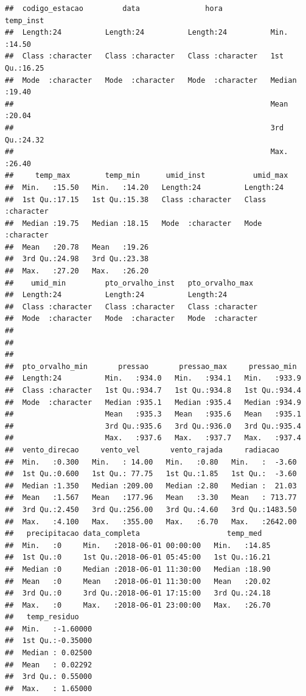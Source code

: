 \documentclass[]{book}
\theoremstyle{definition}
\theoremstyle{definition}
\theoremstyle{definition}
\theoremstyle{remark}
\begin{document}
\begin{verbatim}
##  codigo_estacao         data               hora             temp_inst    
##  Length:24          Length:24          Length:24          Min.   :14.50  
##  Class :character   Class :character   Class :character   1st Qu.:16.25  
##  Mode  :character   Mode  :character   Mode  :character   Median :19.40  
##                                                           Mean   :20.04  
##                                                           3rd Qu.:24.32  
##                                                           Max.   :26.40  
##     temp_max        temp_min      umid_inst           umid_max        
##  Min.   :15.50   Min.   :14.20   Length:24          Length:24         
##  1st Qu.:17.15   1st Qu.:15.38   Class :character   Class :character  
##  Median :19.75   Median :18.15   Mode  :character   Mode  :character  
##  Mean   :20.78   Mean   :19.26                                        
##  3rd Qu.:24.98   3rd Qu.:23.38                                        
##  Max.   :27.20   Max.   :26.20                                        
##    umid_min         pto_orvalho_inst   pto_orvalho_max   
##  Length:24          Length:24          Length:24         
##  Class :character   Class :character   Class :character  
##  Mode  :character   Mode  :character   Mode  :character  
##                                                          
##                                                          
##                                                          
##  pto_orvalho_min       pressao       pressao_max     pressao_min   
##  Length:24          Min.   :934.0   Min.   :934.1   Min.   :933.9  
##  Class :character   1st Qu.:934.7   1st Qu.:934.8   1st Qu.:934.4  
##  Mode  :character   Median :935.1   Median :935.4   Median :934.9  
##                     Mean   :935.3   Mean   :935.6   Mean   :935.1  
##                     3rd Qu.:935.6   3rd Qu.:936.0   3rd Qu.:935.4  
##                     Max.   :937.6   Max.   :937.7   Max.   :937.4  
##  vento_direcao     vento_vel       vento_rajada     radiacao      
##  Min.   :0.300   Min.   : 14.00   Min.   :0.80   Min.   :  -3.60  
##  1st Qu.:0.600   1st Qu.: 77.75   1st Qu.:1.85   1st Qu.:  -3.60  
##  Median :1.350   Median :209.00   Median :2.80   Median :  21.03  
##  Mean   :1.567   Mean   :177.96   Mean   :3.30   Mean   : 713.77  
##  3rd Qu.:2.450   3rd Qu.:256.00   3rd Qu.:4.60   3rd Qu.:1483.50  
##  Max.   :4.100   Max.   :355.00   Max.   :6.70   Max.   :2642.00  
##   precipitacao data_completa                    temp_med    
##  Min.   :0     Min.   :2018-06-01 00:00:00   Min.   :14.85  
##  1st Qu.:0     1st Qu.:2018-06-01 05:45:00   1st Qu.:16.21  
##  Median :0     Median :2018-06-01 11:30:00   Median :18.90  
##  Mean   :0     Mean   :2018-06-01 11:30:00   Mean   :20.02  
##  3rd Qu.:0     3rd Qu.:2018-06-01 17:15:00   3rd Qu.:24.18  
##  Max.   :0     Max.   :2018-06-01 23:00:00   Max.   :26.70  
##   temp_residuo     
##  Min.   :-1.60000  
##  1st Qu.:-0.35000  
##  Median : 0.02500  
##  Mean   : 0.02292  
##  3rd Qu.: 0.55000  
##  Max.   : 1.65000
\end{verbatim}
\end{document}
